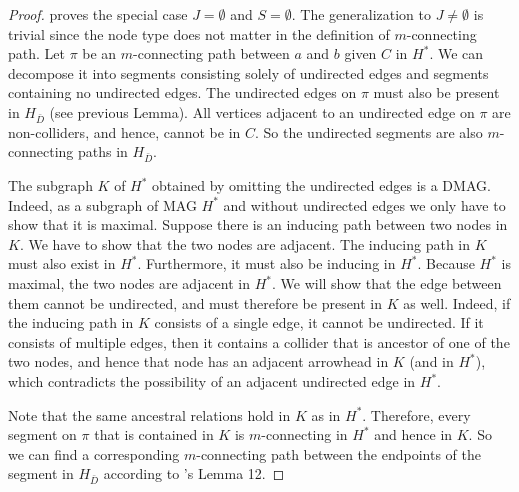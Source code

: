 \begin{proof}
  \cite{Zhang2008_AI} proves the special case $J = \emptyset$ and $S = \emptyset$.
  The generalization to $J \ne \emptyset$ is trivial since the node type does not matter in the definition of $m$-connecting path.
  Let $\pi$ be an $m$-connecting path between $a$ and $b$ given $C$ in $H^*$.
  We can decompose it into segments consisting solely of undirected edges and segments containing no undirected edges.
  The undirected edges on $\pi$ must also be present in $H_{\bar{D}}$ (see previous Lemma).
  All vertices adjacent to an undirected edge on $\pi$ are non-colliders, and hence, cannot be in $C$.
  So the undirected segments are also $m$-connecting paths in $H_{\bar{D}}$.

  The subgraph $K$ of $H^*$ obtained by omitting the undirected edges is a DMAG.
  Indeed, as a subgraph of MAG $H^*$ and without undirected edges we only have to show that it is maximal.
  Suppose there is an inducing path between two nodes in $K$.
  We have to show that the two nodes are adjacent.
  The inducing path in $K$ must also exist in $H^*$.
  Furthermore, it must also be inducing in $H^*$.
  Because $H^*$ is maximal, the two nodes are adjacent in $H^*$.
  We will show that the edge between them cannot be undirected, and must therefore be present in $K$ as well.
  Indeed, if the inducing path in $K$ consists of a single edge, it cannot be undirected.
  If it consists of multiple edges, then it contains a collider that is ancestor of one of the two nodes, and hence that node has an adjacent arrowhead in $K$ (and in $H^*$), which contradicts the possibility of an adjacent undirected edge in $H^*$.

  Note that the same ancestral relations hold in $K$ as in $H^*$.
  Therefore, every segment on $\pi$ that is contained in $K$ is $m$-connecting in $H^*$ and hence in $K$.
  So we can find a corresponding $m$-connecting path between the endpoints of the segment in $H_{\bar{D}}$ according to \cite{Zhang2008_AI}'s Lemma 12.
\end{proof}
